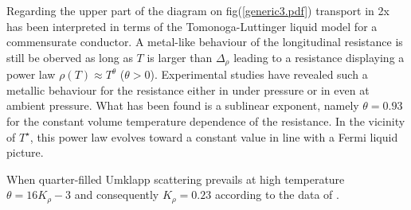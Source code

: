 \documentclass[11pt]{article} %
\begin{document}
Regarding the upper part  of the diagram on  fig(\ref{generic3.pdf}) transport in \tm2x has been interpreted in terms of the Tomonoga-Luttinger liquid model for a commensurate conductor.   A metal-like behaviour of the  longitudinal resistance is still be oberved as long as $T$ is larger than  $\Delta_{\rho}$ leading to a  resistance displaying a power law $\rho (T) \approx T^{\theta}$  ($\theta >0$). Experimental studies  have revealed such a metallic behaviour for the  resistance either in \tfx under pressure\cite{Auban04,Degiorgi06} or  in \tsx even at ambient pressure\cite{Jerome82}. What has been found is a sublinear exponent, namely $\theta = 0.93$ for the constant volume temperature dependence  of  the  resistance\cite{Auban04,Degiorgi06}. In the vicinity of $T^{\star}$, this power law evolves toward a constant value in line with a Fermi liquid picture.

 
When quarter-filled Umklapp scattering prevails at high temperature $\theta = 16K_{\rho}-3$ and consequently  $K_{\rho} = 0.23$ according to the  data of \cite{Degiorgi06}. 


\end{document}
